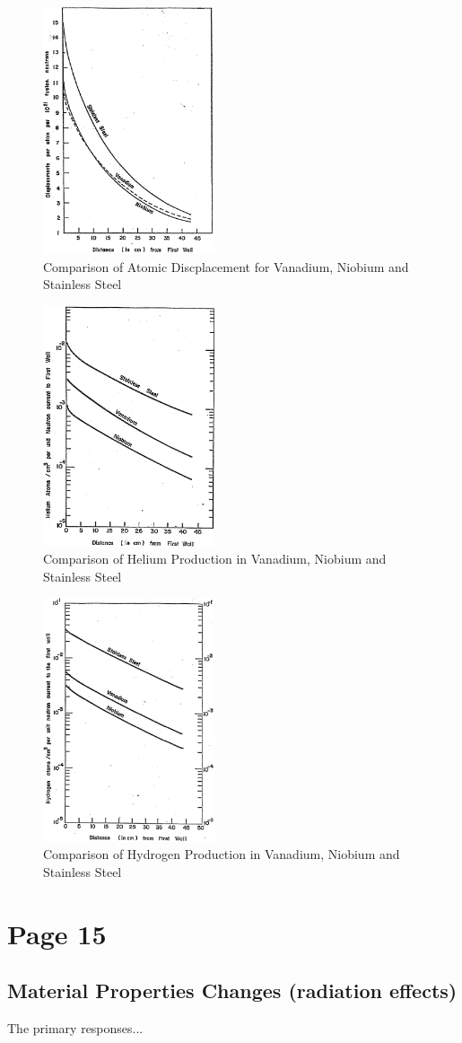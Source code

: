 \documentclass[11pt]{article}
\begin{document}
\begin{figure}
  \centering
  \includegraphics[width=0.45\textwidth]{figs/fig8.png}
  \caption{Comparison of Atomic Discplacement for Vanadium, Niobium and Stainless Steel}
\end{figure}
\begin{figure}
  \centering
  \includegraphics[width=0.45\textwidth]{figs/fig9.png}
  \caption{Comparison of Helium Production in Vanadium, Niobium and Stainless Steel}
\end{figure}
\begin{figure}
  \centering
  \includegraphics[width=0.45\textwidth]{figs/fig10.png}
  \caption{Comparison of Hydrogen Production in Vanadium, Niobium and Stainless Steel}
\end{figure}

\section{Page 15}
\subsection{Material Properties Changes (radiation effects)}
The primary responses...
\end{document}
